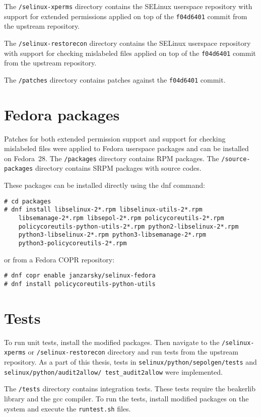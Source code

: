 The \texttt{/selinux-xperms} directory contains the SELinux userspace repository
with support for extended permissions applied on top of the \texttt{f04d6401}
commit from the upstream repository.

The \texttt{/selinux-restorecon} directory contains the SELinux userspace
repository with support for checking mislabeled files applied on top of the
\texttt{f04d6401} commit from the upstream repository.

The \texttt{/patches} directory contains patches against the \texttt{f04d6401}
commit.

\section{Fedora packages}

Patches for both extended permission support and support for checking mislabeled
files were applied to Fedora userspace packages and can be installed on
Fedora~28. The \texttt{/packages} directory contains RPM packages. The
\texttt{/source-packages} directory contains SRPM packages with source codes.

These packages can be installed directly using the dnf command:
\begin{lstlisting}
# cd packages
# dnf install libselinux-2*.rpm libselinux-utils-2*.rpm
    libsemanage-2*.rpm libsepol-2*.rpm policycoreutils-2*.rpm
    policycoreutils-python-utils-2*.rpm python2-libselinux-2*.rpm
    python3-libselinux-2*.rpm python3-libsemanage-2*.rpm
    python3-policycoreutils-2*.rpm
\end{lstlisting}
or from a Fedora COPR repository:
\begin{lstlisting}
# dnf copr enable janzarsky/selinux-fedora
# dnf install policycoreutils-python-utils
\end{lstlisting}

\section{Tests}
To run unit tests, install the modified packages. Then navigate to the
\texttt{/selinux-xperms} or \texttt{/selinux-restorecon} directory and run tests
from the upstream repository. As a part of this thesis, tests in
\texttt{selinux/\allowbreak python/\allowbreak sepolgen/\allowbreak tests} and 
\texttt{selinux/\allowbreak python/\allowbreak audit2al\-low/\allowbreak
test\_audit2allow} were implemented.

The \texttt{/tests} directory contains integration tests. These tests require
the beakerlib library and the gcc compiler. To run the tests, install modified
packages on the system and execute the \texttt{runtest.sh} files.

